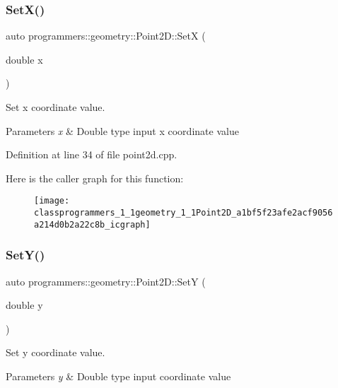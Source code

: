 \subsubsection{\texorpdfstring{Set\+X()}{SetX()}}
{\footnotesize\ttfamily auto programmers\+::geometry\+::\+Point2\+D\+::\+SetX (\begin{DoxyParamCaption}\item[{double}]{x }\end{DoxyParamCaption})}



Set x coordinate value. 


\begin{DoxyParams}{Parameters}
{\em x} & Double type input x coordinate value \\
\hline
\end{DoxyParams}


Definition at line 34 of file point2d.\+cpp.

Here is the caller graph for this function\+:\nopagebreak
\begin{figure}[H]
\begin{center}
\leavevmode
\texttt{[image: classprogrammers\_1\_1geometry\_1\_1Point2D\_a1bf5f23afe2acf9056a214d0b2a22c8b\_icgraph]}
\end{center}
\end{figure}
\mbox{\label{classprogrammers_1_1geometry_1_1Point2D_a68ed3a3ad874d10ec4a8297eeda2b6bd}} 
\subsubsection{\texorpdfstring{Set\+Y()}{SetY()}}
{\footnotesize\ttfamily auto programmers\+::geometry\+::\+Point2\+D\+::\+SetY (\begin{DoxyParamCaption}\item[{double}]{y }\end{DoxyParamCaption})}



Set y coordinate value. 


\begin{DoxyParams}{Parameters}
{\em y} & Double type input coordinate value \\
\hline
\end{DoxyParams}


